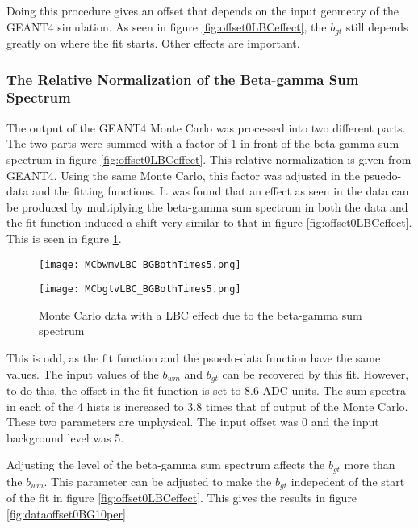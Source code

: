 \documentclass[main.tex]{subfiles}
\begin{document}
Doing this procedure gives an offset that depends on the input geometry of the GEANT4 simulation.
As seen in figure \ref{fig:offset0LBCeffect}, the $b_{gt}$ still depends greatly on where the fit starts.
Other effects are important. 

\subsubsection{The Relative Normalization of the Beta-gamma Sum Spectrum}

The output of the GEANT4 Monte Carlo was processed into two different parts.
The two parts were summed with a factor of 1 in front of the beta-gamma sum spectrum in figure \ref{fig:offset0LBCeffect}.
This relative normalization is given from GEANT4.
Using the same Monte Carlo, this factor was adjusted in the psuedo-data and the fitting functions.
It was found that an effect as seen in the data can be produced by multiplying the beta-gamma sum spectrum in both the data and the fit function induced a shift very similar to that in figure \ref{fig:offset0LBCeffect}.
This is seen in figure \ref{fig:MCTimes5}.    

\begin{figure}
    \centering
    \begin{minipage}{0.50\textwidth}
        \centerline{\texttt{[image: MCbwmvLBC\_BGBothTimes5.png]}}
    \end{minipage}\hfill
    \begin{minipage}{0.50\textwidth}
        \centerline{\texttt{[image: MCbgtvLBC\_BGBothTimes5.png]}}
    \end{minipage}
    \caption{Monte Carlo data with a LBC effect due to the beta-gamma sum spectrum}
    \label{fig:MCTimes5}
\end{figure}

This is odd, as the fit function and the psuedo-data function have the same values.
The input values of the $b_{wm}$ and $b_{gt}$ can be recovered by this fit.
However, to do this, the offset in the fit function is set to 8.6 ADC units.
The sum spectra in each of the 4 hists is increased to 3.8 times that of output of the Monte Carlo.
These two parameters are unphysical.
The input offset was 0 and the input background level was 5.

Adjusting the level of the beta-gamma sum spectrum affects the $b_{gt}$ more than the $b_{wm}$.
This parameter can be adjusted to make the $b_{gt}$ indepedent of the start of the fit in figure \ref{fig:offset0LBCeffect}. 
This gives the results in figure \ref{fig:dataoffset0BG10per}. 
\end{document}
